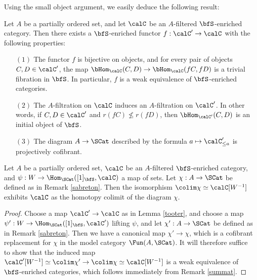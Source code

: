 \begin{Simplicial Categories}
Using the small object argument, we easily deduce the following result:

\begin{lemma}\label{tooter}
Let $A$ be a partially ordered set, and let $\calC$ be an $A$-filtered
$\bfS$-enriched category. Then there exists a $\bfS$-enriched functor
$f: \calC' \rightarrow \calC$ with the following properties:
\begin{itemize}
\item[$(1)$] The functor $f$ is bijective on objects, and for every
pair of objects $C,D \in \calC'$, the map $\bHom_{\calC}(C,D)
\rightarrow \bHom_{\calC}(fC, fD)$ is a trivial fibration in $\bfS$. In particular,
$f$ is a weak equivalence of $\bfS$-enriched categories.

\item[$(2)$] The $A$-filtration on $\calC$ induces an $A$-filtration on $\calC'$. In other
words, if $C, D \in \calC'$ and $r(fC) \nleq r(fD)$, then $\bHom_{\calC'}(C,D)$ is
an initial object of $\bfS$.

\item[$(3)$] The diagram $A \rightarrow \SCat$ described by the formula
$a \mapsto \calC'_{\leq a}$ is projectively cofibrant.
\end{itemize}
\end{lemma}

\begin{proposition}\label{scun}
Let $A$ be a partially ordered set, $\calC$ be an $A$-filtered
$\bfS$-enriched category, and $\psi: W \rightarrow \Hom_{ \SCat}( [1]_{\bfS}, \calC)$
a map of sets. Let $\chi: A \rightarrow \SCat$ be defined as in Remark \ref{sabreton}. Then the
isomorphism $\colim \chi \simeq \calC[W^{-1}]$ exhibits $\calC$ as the homotopy colimit
of the diagram $\chi$.
\end{proposition}

\begin{proof}
Choose a map $\calC' \rightarrow \calC$ as in Lemma \ref{tooter}, and
choose a map $\psi': W \rightarrow \Hom_{\SCat}( [1]_{\bfS}, \calC' )$ lifting
$\psi$, and let $\chi': A \rightarrow \SCat$ be defined as in Remark \ref{sabreton}.
Then we have a canonical map $\chi' \rightarrow \chi$, which is a cofibrant
replacement for $\chi$ in the model category $\Fun( A, \SCat)$. It will therefore suffice to show that the induced map
$\calC'[W^{-1}] \simeq \colim \chi' \rightarrow \colim \chi \simeq \calC[W^{-1}]$ is a weak equivalence of
$\bfS$-enriched categories, which follows immediately from Remark \ref{summat}.
\end{proof}


\end{Simplicial Categories}
